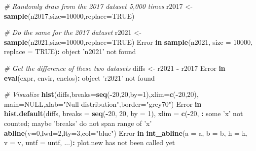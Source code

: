 \documentclass[]{book}
\newenvironment{Shaded}{\begin{snugshade}}{\end{snugshade}}
\newcommand{\CommentTok}[1]{\textcolor[rgb]{0.56,0.35,0.01}{\textit{#1}}}
\newcommand{\ControlFlowTok}[1]{\textcolor[rgb]{0.13,0.29,0.53}{\textbf{#1}}}
\newcommand{\DataTypeTok}[1]{\textcolor[rgb]{0.13,0.29,0.53}{#1}}
\newcommand{\DecValTok}[1]{\textcolor[rgb]{0.00,0.00,0.81}{#1}}
\newcommand{\KeywordTok}[1]{\textcolor[rgb]{0.13,0.29,0.53}{\textbf{#1}}}
\newcommand{\NormalTok}[1]{#1}
\newcommand{\OperatorTok}[1]{\textcolor[rgb]{0.81,0.36,0.00}{\textbf{#1}}}
\newcommand{\OtherTok}[1]{\textcolor[rgb]{0.56,0.35,0.01}{#1}}
\newcommand{\StringTok}[1]{\textcolor[rgb]{0.31,0.60,0.02}{#1}}
\begin{document}
\begin{Shaded}
\begin{Highlighting}[]
\CommentTok{# Randomly draw from the 2017 dataset 5,000 times}
\NormalTok{r2017 <-}\StringTok{ }\KeywordTok{sample}\NormalTok{(n2017,}\DataTypeTok{size=}\DecValTok{10000}\NormalTok{,}\DataTypeTok{replace=}\OtherTok{TRUE}\NormalTok{)}

\CommentTok{# Do the same for the 2017 dataset}
\NormalTok{r2021 <-}\StringTok{ }\KeywordTok{sample}\NormalTok{(n2021,}\DataTypeTok{size=}\DecValTok{10000}\NormalTok{,}\DataTypeTok{replace=}\OtherTok{TRUE}\NormalTok{)}
\NormalTok{Error }\ControlFlowTok{in} \KeywordTok{sample}\NormalTok{(n2021, }\DataTypeTok{size =} \DecValTok{10000}\NormalTok{, }\DataTypeTok{replace =} \OtherTok{TRUE}\NormalTok{)}\OperatorTok{:}\StringTok{ }\NormalTok{object }\StringTok{'n2021'}\NormalTok{ not found}

\CommentTok{# Get the difference of these two datasets}
\NormalTok{diffs <-}\StringTok{ }\NormalTok{r2021 }\OperatorTok{-}\StringTok{ }\NormalTok{r2017}
\NormalTok{Error }\ControlFlowTok{in} \KeywordTok{eval}\NormalTok{(expr, envir, enclos)}\OperatorTok{:}\StringTok{ }\NormalTok{object }\StringTok{'r2021'}\NormalTok{ not found}

\CommentTok{# Visualize}
\KeywordTok{hist}\NormalTok{(diffs,}\DataTypeTok{breaks=}\KeywordTok{seq}\NormalTok{(}\OperatorTok{-}\DecValTok{20}\NormalTok{,}\DecValTok{20}\NormalTok{,}\DataTypeTok{by=}\DecValTok{1}\NormalTok{),}\DataTypeTok{xlim=}\KeywordTok{c}\NormalTok{(}\OperatorTok{-}\DecValTok{20}\NormalTok{,}\DecValTok{20}\NormalTok{),}
     \DataTypeTok{main=}\OtherTok{NULL}\NormalTok{,}\DataTypeTok{xlab=}\StringTok{"Null distribution"}\NormalTok{,}\DataTypeTok{border=}\StringTok{"grey70"}\NormalTok{)}
\NormalTok{Error }\ControlFlowTok{in} \KeywordTok{hist.default}\NormalTok{(diffs, }\DataTypeTok{breaks =} \KeywordTok{seq}\NormalTok{(}\OperatorTok{-}\DecValTok{20}\NormalTok{, }\DecValTok{20}\NormalTok{, }\DataTypeTok{by =} \DecValTok{1}\NormalTok{), }\DataTypeTok{xlim =} \KeywordTok{c}\NormalTok{(}\OperatorTok{-}\DecValTok{20}\NormalTok{, }\OperatorTok{:}\StringTok{ }\NormalTok{some }\StringTok{'x'}\NormalTok{ not counted; maybe }\StringTok{'breaks'}\NormalTok{ do not span range of }\StringTok{'x'}
\KeywordTok{abline}\NormalTok{(}\DataTypeTok{v=}\DecValTok{0}\NormalTok{,}\DataTypeTok{lwd=}\DecValTok{2}\NormalTok{,}\DataTypeTok{lty=}\DecValTok{3}\NormalTok{,}\DataTypeTok{col=}\StringTok{"blue"}\NormalTok{)}
\NormalTok{Error }\ControlFlowTok{in} \KeywordTok{int_abline}\NormalTok{(}\DataTypeTok{a =}\NormalTok{ a, }\DataTypeTok{b =}\NormalTok{ b, }\DataTypeTok{h =}\NormalTok{ h, }\DataTypeTok{v =}\NormalTok{ v, }\DataTypeTok{untf =}\NormalTok{ untf, ...)}\OperatorTok{:}\StringTok{ }\NormalTok{plot.new has not been called yet}


\end{Highlighting}
\end{Shaded}
\end{document}
